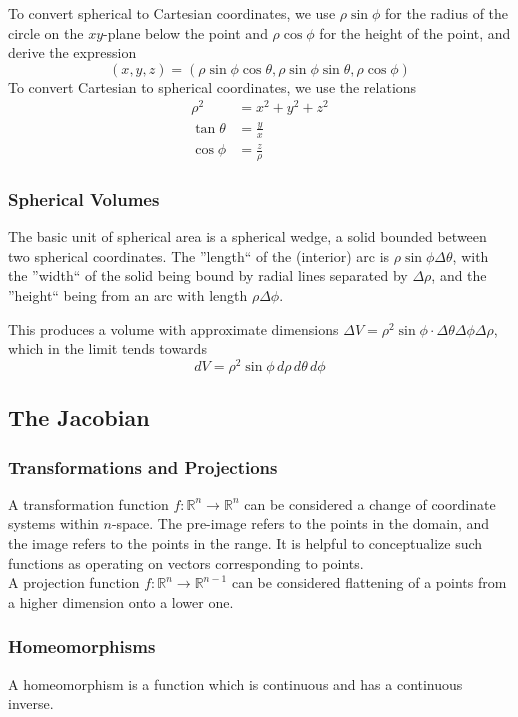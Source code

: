 \documentclass{article}
\begin{document}
To convert spherical to Cartesian coordinates, we use $\rho\sin\phi$ for the radius of the circle on the $xy$-plane below the point and $\rho\cos\phi$ for the height of the point, and derive the expression
$$(x,y,z)=(\rho\sin\phi\cos\theta,\rho\sin\phi\sin\theta,\rho\cos\phi)$$
To convert Cartesian to spherical coordinates, we use the relations
\begin{align*}
    \rho^2&=x^2+y^2+z^2\\
    \tan\theta&=\frac{y}{x}\\
    \cos\phi&=\frac{z}{\rho}
\end{align*}

\subsubsection{Spherical Volumes}
The basic unit of spherical area is a spherical wedge, a solid bounded between two spherical coordinates. The ''length`` of the (interior) arc is $\rho\sin\phi\Delta\theta$, with the ''width`` of the solid being bound by radial lines separated by $\Delta\rho$, and the ''height`` being from an arc with length $\rho\Delta\phi$.

This produces a volume with approximate dimensions $\Delta{V}=\rho^2\sin\phi\cdot\Delta\theta\Delta\phi\Delta\rho$, which in the limit tends towards
$$dV=\rho^2\sin\phi\,d\rho\,d\theta\,d\phi$$

\subsection{The Jacobian}

\subsubsection{Transformations and Projections}
A transformation function $f: \mathbb{R}^n\to\mathbb{R}^n$ can be considered a change of coordinate systems within $n$-space. The pre-image refers to the points in the domain, and the image refers to the points in the range. It is helpful to conceptualize such functions as operating on vectors corresponding to points.\\
A projection function $f: \mathbb{R}^n\to\mathbb{R}^{n-1}$ can be considered flattening of a points from a higher dimension onto a lower one.

\subsubsection{Homeomorphisms}
A homeomorphism is a function which is continuous and has a continuous inverse.
\end{document}
